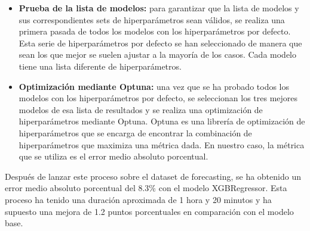 \begin{itemize}
    \item \textbf{Prueba de la lista de modelos:} para garantizar que la lista
    de modelos y sus correspondientes sets de hiperparámetros sean válidos, se
    realiza una primera pasada de todos los modelos con los hiperparámetros por defecto.
    Esta serie de hiperparámetros por defecto se han seleccionado de manera que sean
    los que mejor se suelen ajustar a la mayoría de los casos. Cada modelo tiene una
    lista diferente de hiperparámetros.
    \item \textbf{Optimización mediante Optuna:} una vez que se ha probado todos los modelos
    con los hiperparámetros por defecto, se seleccionan los tres mejores modelos de esa lista
    de resultados y se realiza una optimización de hiperparámetros mediante Optuna. Optuna
    es una librería de optimización de hiperparámetros que se encarga de encontrar la combinación
    de hiperparámetros que maximiza una métrica dada. En nuestro caso, la métrica que se
    utiliza es el error medio absoluto porcentual.
\end{itemize}

Después de lanzar este proceso sobre el dataset de forecasting, se ha obtenido
un error medio absoluto porcentual del 8.3\% con el modelo XGBRegressor. Esta proceso
ha tenido una duración aproximada de 1 hora y 20 minutos y ha supuesto una mejora de
1.2 puntos porcentuales en comparación con el modelo base. 